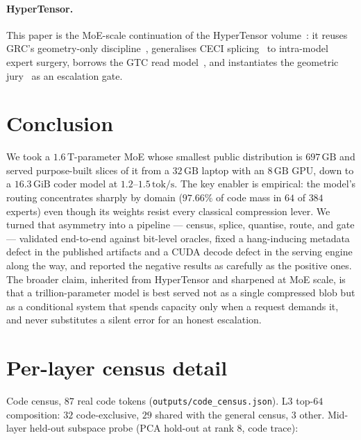 \documentclass[11pt]{article}
\newcommand{\code}[1]{\texttt{#1}}
\newcommand{\gib}{\,\textrm{GiB}}
\newcommand{\gb}{\,\textrm{GB}}
\newcommand{\tps}{\,\textrm{tok/s}}
\begin{document}
\paragraph{HyperTensor.} This paper is the MoE-scale continuation of the
HyperTensor volume~\cite{stewart2026hypertensor}: it reuses GRC's geometry-only
discipline~\cite{stewart2026grc}, generalises CECI splicing~\cite{stewart2026ceci}
to intra-model expert surgery, borrows the GTC read
model~\cite{stewart2026ott,stewart2026gtc}, and instantiates the geometric
jury~\cite{stewart2026cog} as an escalation gate.

\section{Conclusion}
\label{sec:conclusion}

We took a $1.6\,\textrm{T}$-parameter MoE whose smallest public distribution is
$697\gb{}$ and served purpose-built slices of it from a $32\gb{}$ laptop with an
$8\gb{}$ GPU, down to a $16.3\gib{}$ coder model at $1.2$--$1.5\tps{}$. The key
enabler is empirical: the model's routing concentrates sharply by domain
($97.66\%$ of code mass in $64$ of $384$ experts) even though its weights resist
every classical compression lever. We turned that asymmetry into a pipeline ---
census, splice, quantise, route, and gate --- validated end-to-end against
bit-level oracles, fixed a hang-inducing metadata defect in the published
artifacts and a CUDA decode defect in the serving engine along the way,
and reported the negative results as carefully as the positive ones. The broader
claim, inherited from HyperTensor and sharpened at MoE scale, is that a
trillion-parameter model is best served not as a single compressed blob but as a
conditional system that spends capacity only when a request demands it, and never
substitutes a silent error for an honest escalation.

\printbibliography[title={References}]

\appendix
\section{Per-layer census detail}
\label{app:census}

Code census, $87$ real code tokens (\code{outputs/code\_census.json}). L3
top-$64$ composition: $32$ code-exclusive, $29$ shared with the general census,
$3$ other. Mid-layer held-out subspace probe (PCA hold-out at rank $8$, code
trace):
\end{document}
